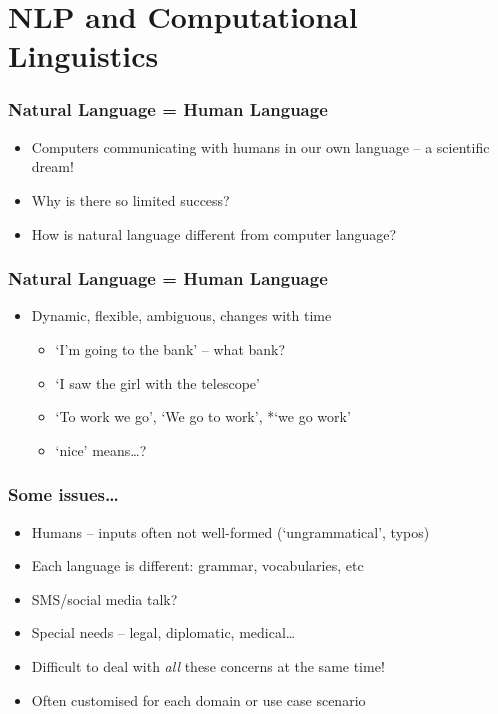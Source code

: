 \section{NLP and Computational Linguistics}


\begin{frame}
\frametitle{Natural Language = Human Language}
\begin{itemize}[<+->]
\item Computers communicating with humans in our own language -- a scientific dream!
\item \alert{Why is there so limited success?}
\item How is natural language different from computer language?
\end{itemize}
\end{frame}

\begin{frame}
\frametitle{Natural Language = Human Language}

\begin{itemize}[<+->]
\item Dynamic, flexible, ambiguous, changes with time
   \begin{itemize}[<+->]
   \item `I'm going to the bank' -- what bank?
   \item `I saw the girl with the telescope'
   \item `To work we go', `We go to work', *`we go work'
   \item `nice' means\ldots?
   \end{itemize}
\end{itemize}
\end{frame}


\begin{frame}
\frametitle{Some issues\ldots}
\begin{itemize}
\item Humans -- inputs often not well-formed (`ungrammatical', typos)
\item Each language is different: grammar, vocabularies, etc
\item SMS/social media talk?
\item Special needs -- legal, diplomatic, medical\ldots
\item Difficult to deal with \emph{all} these concerns at the same time!
\item Often customised for each domain or use case scenario
\end{itemize}
\end{frame}


